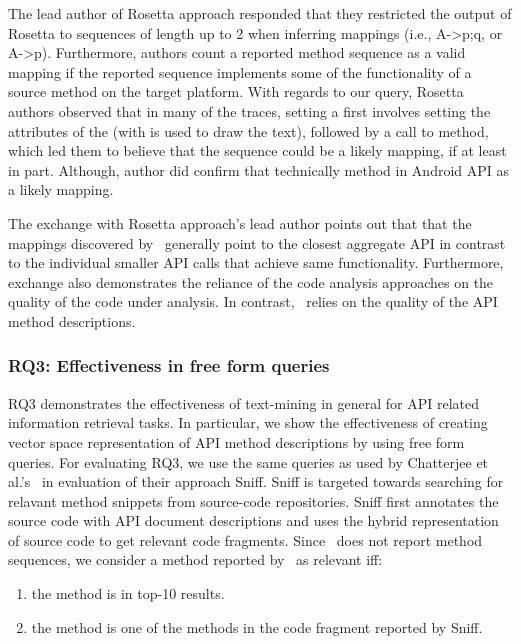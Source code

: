 The lead author of Rosetta approach responded that they restricted the output of
Rosetta to sequences of length up to 2 when inferring mappings (i.e., {A->p;q}, or {A->p}). Furthermore, authors count a reported method sequence as a valid mapping
if the reported sequence implements some of the functionality of a source method on the target platform.
With regards to our query, Rosetta authors observed that in many of the traces, setting a  first involves setting the attributes of the  (with is used to draw the text), followed by a call to  method, which led them to believe that the sequence    could be a likely mapping, if at least in part.
Although, author did confirm that technically  method in Android API as a likely mapping.

The exchange with Rosetta approach's lead author points out that
that the mappings discovered by \tool\ generally point to
the closest aggregate API in contrast to the individual smaller API calls
that achieve same functionality.
Furthermore, exchange also demonstrates the reliance of the
code analysis approaches on the quality of the code under analysis.
In contrast, \tool\ relies on the quality of the API method descriptions.


\subsubsection{RQ3: Effectiveness in free form queries}

RQ3 demonstrates the effectiveness of text-mining in general for API related information retrieval tasks.
In particular, we show the effectiveness of creating vector space representation of
API method descriptions by using free form queries.
For evaluating RQ3, we use the same queries as used by Chatterjee et al.'s~\cite{chatterjee2009sniff} in evaluation of their approach Sniff.
Sniff is targeted towards searching for relavant method snippets from source-code repositories. Sniff first annotates the source code with API document descriptions and uses the hybrid representation of source code to get relevant code fragments. 
Since \tool\ does not report method sequences, we consider a method reported by \tool\ as relevant iff:

\begin{enumerate}
	\vspace{-2ex}\item the method is in top-10 results.
	\vspace{-2ex}\item the method is one of the methods in the code fragment reported by Sniff.
\end{enumerate}

